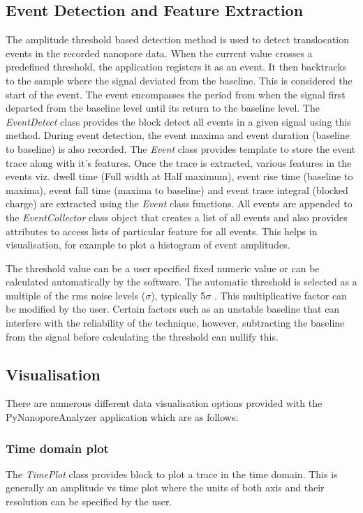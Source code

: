 \documentclass[journal]{IEEEtran}
\begin{document}
\subsection{Event Detection and Feature Extraction}
The amplitude threshold based detection method is used to detect translocation events in the recorded nanopore data. When the  current value crosses a predefined threshold, the application registers it as an event. It then backtracks to the sample where the signal deviated from the baseline. This is considered the start of the event. The event encompasses the period from when the signal first departed from the baseline level until its return to the baseline level. The \textit{EventDetect} class provides the block detect all events in a given signal using this method. During event detection, the event maxima and event duration (baseline to baseline) is also recorded. The \textit{Event} class provides template to store the event trace along with it's features. Once the trace is extracted, various features in the events viz. dwell time (Full width at Half maximum), event rise time (baseline to maxima), event fall time (maxima to baseline) and event trace integral (blocked charge) are extracted using the \textit{Event} class functions. All events are appended to the \textit{EventCollector} class object that creates a list of all events and also provides attributes to access lists of particular feature for all events. This helps in visualisation, for example to plot a histogram of event amplitudes.

The threshold value can be a user specified fixed numeric value or can be calculated automatically by the software. The automatic threshold is selected as a multiple of the rms noise levels ($\sigma$), typically 5$\sigma$ \cite{plesaDataAnalysisMethods2015}. This multiplicative factor can be modified by the user. Certain factors such as an unstable baseline that can interfere with the reliability of the technique, however, subtracting the baseline from the signal before calculating the threshold can nullify this. 

\subsection{Visualisation}
There are numerous different data visualisation options provided with the PyNanoporeAnalyzer application which are as follows:

\subsubsection{Time domain plot}
The \textit{TimePlot} class provides block to plot a trace in the time domain. This is generally an amplitude vs time plot where the units of both axis and their resolution can be specified by the user.
\end{document}
